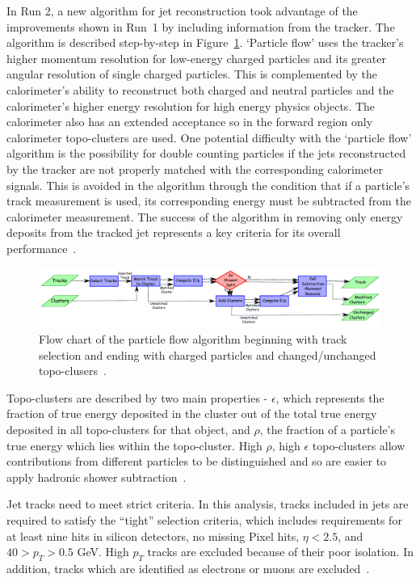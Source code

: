 In Run 2, a new algorithm for jet reconstruction took advantage of the improvements shown in Run~1 by including information from the tracker. The algorithm is described step-by-step in Figure~\ref{fig:ParticleFlow}. `Particle flow' uses the tracker's higher momentum resolution for low-energy charged particles and its greater angular resolution of single charged particles. This is complemented by the calorimeter's ability to reconstruct both charged and neutral particles and the calorimeter's higher energy resolution for high energy physics objects. The calorimeter also has an extended acceptance so in the forward region only calorimeter topo-clusters are used. One potential difficulty with the `particle flow' algorithm is the possibility for double counting particles if the jets reconstructed by the tracker are not properly matched with the corresponding calorimeter signals. This is avoided in the algorithm through the condition that if a particle's track measurement is used, its corresponding energy must be subtracted from the calorimeter measurement. The success of the algorithm in removing only energy deposits from the tracked jet represents a key criteria for its overall performance~\cite{ParticleFlow}.

\begin{figure}[!h]
        \centering
    \includegraphics[width=.85\textwidth]{Pictures/ParticleFlow.png}
    \caption{Flow chart of the particle flow algorithm beginning with track selection and ending with charged particles and changed/unchanged topo-clusers~\cite{ParticleFlow}.}
    \label{fig:ParticleFlow}
\end{figure}

Topo-clusters are described by two main properties - $\epsilon$, which represents the fraction of true energy deposited in the cluster out of the total true energy deposited in all topo-clusters for that object, and $\rho$, the fraction of a particle's true energy which lies within the topo-cluster. High $\rho$, high $\epsilon$ topo-clusters allow contributions from different particles to be distinguished and so are easier to apply hadronic shower subtraction~\cite{ParticleFlow}.

Jet tracks need to meet strict criteria. In this analysis, tracks included in jets are required to satisfy the ``tight'' selection criteria, which includes requirements for at least nine hits in silicon detectors, no missing Pixel hits, $\eta<2.5$, and $40>p_T>0.5$ GeV. High $p_T$ tracks are excluded because of their poor isolation. In addition, tracks which are identified as electrons or muons are excluded~\cite{ParticleFlow}. 

